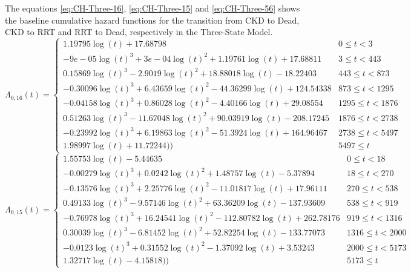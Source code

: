 \documentclass[12pt,PhD,twoside,openright]{muthesis}
\begin{document}
The equations \eqref{eq:CH-Three-16}, \eqref{eq:CH-Three-15} and \eqref{eq:CH-Three-56} shows the baseline cumulative hazard functions for the transition from CKD to Dead, CKD to RRT and RRT to Dead, respectively in the Three-State Model.
\begin{equation}
\Lambda_{0,16}(t)=\begin{cases} 1.19795\log(t)+17.68798 & 0 \le t < 3 \\ -9e-05\log(t)^3+3e-04\log(t)^2+1.19761\log(t)+17.68811 & 3 \le t < 443 \\ 0.15869\log(t)^3-2.9019\log(t)^2+18.88018\log(t)-18.22403 & 443 \le t < 873 \\ -0.30096\log(t)^3+6.43659\log(t)^2-44.36299\log(t)+124.54338 & 873 \le t < 1295 \\ -0.04158\log(t)^3+0.86028\log(t)^2-4.40166\log(t)+29.08554 & 1295 \le t < 1876 \\ 0.51263\log(t)^3-11.67048\log(t)^2+90.03919\log(t)-208.17245 & 1876 \le t < 2738 \\ -0.23992\log(t)^3+6.19863\log(t)^2-51.3924\log(t)+164.96467 & 2738 \le t < 5497 \\ 1.98997\log(t)+11.72244)) & 5497 \le t \label{eq:CH-Three-16}\end{cases}
\end{equation}
\begin{equation}
\Lambda_{0,15}(t)=\begin{cases} 1.55753\log(t)-5.44635 & 0 \le t < 18 \\ -0.00279\log(t)^3+0.0242\log(t)^2+1.48757\log(t)-5.37894 & 18 \le t < 270 \\ -0.13576\log(t)^3+2.25776\log(t)^2-11.01817\log(t)+17.96111 & 270 \le t < 538 \\ 0.49133\log(t)^3-9.57146\log(t)^2+63.36209\log(t)-137.93609 & 538 \le t < 919 \\ -0.76978\log(t)^3+16.24541\log(t)^2-112.80782\log(t)+262.78176 & 919 \le t < 1316 \\ 0.30039\log(t)^3-6.81452\log(t)^2+52.82254\log(t)-133.77073 & 1316 \le t < 2000 \\ -0.0123\log(t)^3+0.31552\log(t)^2-1.37092\log(t)+3.53243 & 2000 \le t < 5173 \\ 1.32717\log(t)-4.15818)) & 5173 \le t \label{eq:CH-Three-15}\end{cases}
\end{equation}
\end{document}

